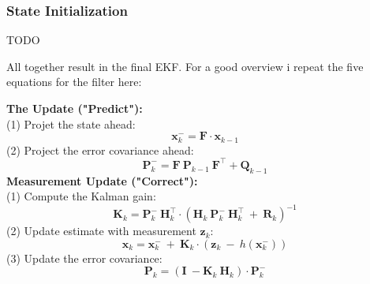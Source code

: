 \subsubsection{State Initialization}
TODO

All together result in the final EKF. For a good overview i repeat the five equations for the filter here:

\textbf{The Update ("Predict"):}\\
(1) Projet the state ahead:
\begin{equation}
\mathbf{x}_k^- = \mathbf{F} \cdot \mathbf{x}_{k-1}
\end{equation}
(2) Project the error covariance ahead:
\begin{equation}
\mathbf{P}_k^- = \mathbf{F}\ \mathbf{P}_{k-1}\ \mathbf{F}^\intercal + \mathbf{Q}_{k-1}
\end{equation}
\textbf{Measurement Update ("Correct"):}\\
(1) Compute the Kalman gain:
\begin{equation}
\mathbf{K}_k = \mathbf{P}_k^-\ \mathbf{H}_k^\intercal\cdot (\mathbf{H}_k\ \mathbf{P}_k^-\ \mathbf{H}_k^\intercal \ + \ \mathbf{R}_k)^{-1} 
\end{equation}
(2) Update estimate with measurement $\mathbf{z}_k$:
\begin{equation}
\mathbf{x}_k = \mathbf{x}_k^- \ + \ \mathbf{K}_k\cdot (\mathbf{z}_k \ - \ h(\mathbf{x}_k^-))
\end{equation} 
(3) Update the error covariance:
\begin{equation}
\mathbf{P}_k = (\mathbf{I} \ - \mathbf{K}_k\ \mathbf{H}_k)\cdot \mathbf{P}_k^-
\end{equation}
